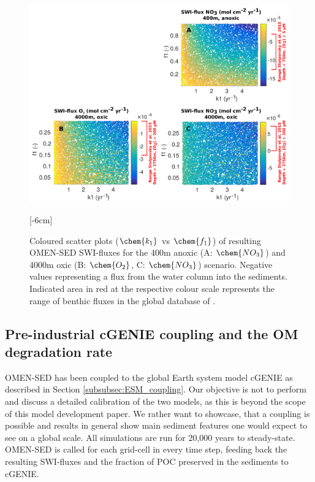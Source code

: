 \documentclass[gmd, manuscript]{copernicus}
\begin{document}
\begin{figure}[htbp]
\begin{center}
	\includegraphics[width=1.0\textwidth]{figures/SA/k1_vs_f1_SWIflux_COMBINED_1604.pdf}
	\caption{Coloured scatter plots ($\chem{k_1}$ vs $\chem{f_1}$) of resulting OMEN-SED SWI-fluxes for the 400m anoxic (A: $\chem{NO_3}$) and 4000m oxic (B: $\chem{O_2}$, C: $\chem{NO_3}$) scenario. 
	Negative values representing a flux from the water column into the sediments.
	Indicated area in red at the respective colour scale represents the range of benthic fluxes in the global database of \citet{bohlen_simple_2012}. 
}\label{fig:SA_Color_ScatterPlots}
[-6cm]%
\end{center}
\end{figure}



% 

\subsection{Pre-industrial cGENIE coupling and the OM degradation rate}\label{subsec:GENIE-pre-ind}
OMEN-SED has been coupled to the global Earth system model cGENIE as described in Section \ref{subsubsec:ESM_coupling}. 
Our objective is not to perform and discuss a detailed calibration of the two  models, as this is beyond the scope of this model development paper. 
We rather want to showcase, that a coupling is possible and results in general show  main sediment features one would expect to see on a global scale. 
All simulations are run for 20,000 years to steady-state. OMEN-SED is called for each grid-cell in every time step, feeding back the resulting SWI-fluxes and the 
fraction of POC preserved in the sediments to cGENIE. 
\end{document}
